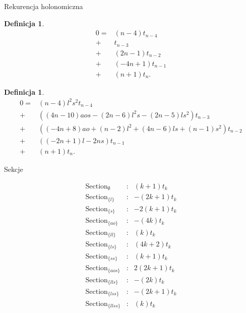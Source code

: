 \documentclass[final]{beamer}
\theoremstyle{bluetheorem}
\theoremstyle{bluetheorem}
\newtheorem{mydefinition}[mytheorem]{Definicja}
\theoremstyle{greentheorem}
\DeclareMathOperator{\tSection}{\text{Section}}
\begin{document}
\begin{frame}{Rekurencja holonomiczna}
    \begin{mydefinition}
        \[\begin{array}{rl}
                0 =& (n - 4) t_{n - 4}\\
                +& t_{n - 3}\\
                +& (2 n - 1) t_{n - 2}\\
                +& (-4 n + 1) t_{n - 1}\\
                +& (n + 1) t_{n}.
        \end{array}\]
    \end{mydefinition}

    \begin{mydefinition}
        \[\begin{array}{rl}
            0 =& (n - 4) l^2 s^2 t_{n - 4}\\
            +& ((4 n - 10) a o s - (2 n - 6) l^2 s - (2 n - 5) l s^2) t_{n - 3}\\
            +& ((-4 n + 8) a o + (n - 2) l^2 + (4 n - 6) l s + (n - 1) s^2) t_{n - 2}\\
            +& ((-2 n + 1) l - 2 n s) t_{n - 1}\\
            +& (n + 1) t_{n}.
        \end{array}\]
    \end{mydefinition}
\end{frame}

\begin{frame}{Sekcje}
    \begin{block}{}
        \[\begin{array}{lcr}
            \tSection_{\emptyset} &:& (k + 1) t_k\\
            \tSection_{\{l\}} &:& - (2 k + 1) t_k\\
            \tSection_{\{s\}} &:& - 2 (k + 1) t_k\\
            \tSection_{\{ao\}} &:& - (4 k) t_k\\
            \tSection_{\{ll\}} &:& (k) t_k\\
            \tSection_{\{ls\}} &:& (4 k + 2) t_k\\
            \tSection_{\{ss\}} &:& (k + 1) t_k\\
            \tSection_{\{aos\}} &:& 2 (2 k + 1) t_k\\
            \tSection_{\{lls\}} &:& - (2 k) t_k\\
            \tSection_{\{lss\}} &:& - (2 k + 1) t_k\\
            \tSection_{\{llss\}} &:& (k) t_k\\
        \end{array}\]
    \end{block}
\end{frame}
\end{document}
